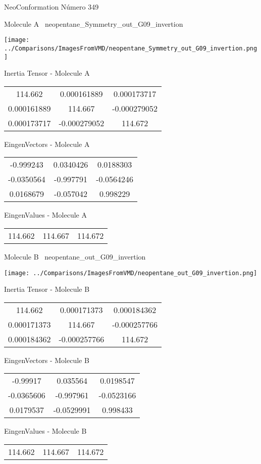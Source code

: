 \vtab[-3cm]
\begin{center}
{\large NeoConformation \tab Número 349}
\end{center}
\begin{multicols}{2}
\begin{center}

Molecule A \
neopentane\_Symmetry\_out\_G09\_invertion

\texttt{[image: ../Comparisons/ImagesFromVMD/neopentane\_Symmetry\_out\_G09\_invertion.png]}

Inertia Tensor - Molecule A \\
\begin{tabular}{|c c c|}
114.662	 & 	0.000161889	 & 	0.000173717	 \\
0.000161889	 & 	114.667	 & 	-0.000279052	 \\
0.000173717	 & 	-0.000279052	 & 	114.672
\end{tabular}

\vtab
 EingenVectors - Molecule A     \\
\begin{tabular}{|c c c|}
-0.999243	 & 	0.0340426	 & 	0.0188303	 \\
-0.0350564	 & 	-0.997791	 & 	-0.0564246	 \\
0.0168679	 & 	-0.057042	 & 	0.998229
\end{tabular}

\vtab
 EingenValues - Molecule A     \\
\begin{tabular}{|c c c|}
114.662	 & 	114.667	 & 	114.672	 \\
\end{tabular}
\columnbreak

Molecule B \
neopentane\_out\_G09\_invertion

\texttt{[image: ../Comparisons/ImagesFromVMD/neopentane\_out\_G09\_invertion.png]}

Inertia Tensor - Molecule B \\
\begin{tabular}{|c c c|}
114.662	 & 	0.000171373	 & 	0.000184362	 \\
0.000171373	 & 	114.667	 & 	-0.000257766	 \\
0.000184362	 & 	-0.000257766	 & 	114.672
\end{tabular}

\vtab
 EingenVectors - Molecule B     \\
\begin{tabular}{|c c c|}
-0.99917	 & 	0.035564	 & 	0.0198547	 \\
-0.0365606	 & 	-0.997961	 & 	-0.0523166	 \\
0.0179537	 & 	-0.0529991	 & 	0.998433
\end{tabular}

\vtab
 EingenValues - Molecule B     \\
\begin{tabular}{|c c c|}
114.662	 & 	114.667	 & 	114.672	 \\
\end{tabular}

\end{center}
\end{multicols}

